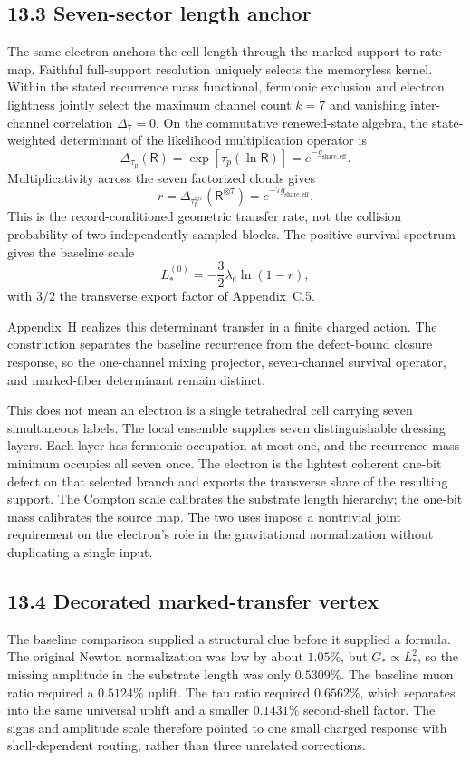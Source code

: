 \documentclass[11pt]{article}
\begin{document}
\subsection{13.3 Seven-sector length anchor}

The same electron anchors the cell length through the marked support-to-rate map. Faithful full-support resolution uniquely selects the memoryless kernel. Within the stated recurrence mass functional, fermionic exclusion and electron lightness jointly select the maximum channel count $k=7$ and vanishing inter-channel correlation $\Delta_7=0$. On the commutative renewed-state algebra, the state-weighted determinant of the likelihood multiplication operator is
\[
\Delta_{\tau_p}(\mathsf R)
=\exp[\tau_p(\ln\mathsf R)]
=e^{-g_{\mathrm{share,eff}}}.
\]
Multiplicativity across the seven factorized clouds gives
\[
r=\Delta_{\tau_p^{\otimes7}}(\mathsf R^{\otimes7})
=e^{-7g_{\mathrm{share,eff}}}.
\]
This is the record-conditioned geometric transfer rate, not the collision probability of two independently sampled blocks. The positive survival spectrum gives the baseline scale
\[
L_*^{(0)}=-\frac32\lambda_e\ln(1-r),
\]
with $3/2$ the transverse export factor of Appendix~C.5.

Appendix~H realizes this determinant transfer in a finite charged action. The construction separates the baseline recurrence from the defect-bound closure response, so the one-channel mixing projector, seven-channel survival operator, and marked-fiber determinant remain distinct.

This does not mean an electron is a single tetrahedral cell carrying seven simultaneous labels. The local ensemble supplies seven distinguishable dressing layers. Each layer has fermionic occupation at most one, and the recurrence mass minimum occupies all seven once. The electron is the lightest coherent one-bit defect on that selected branch and exports the transverse share of the resulting support. The Compton scale calibrates the substrate length hierarchy; the one-bit mass calibrates the source map. The two uses impose a nontrivial joint requirement on the electron's role in the gravitational normalization without duplicating a single input.

\subsection{13.4 Decorated marked-transfer vertex}

The baseline comparison supplied a structural clue before it supplied a formula. The original Newton normalization was low by about $1.05\%$, but $G_*\propto L_*^2$, so the missing amplitude in the substrate length was only $0.5309\%$. The baseline muon ratio required a $0.5124\%$ uplift. The tau ratio required $0.6562\%$, which separates into the same universal uplift and a smaller $0.1431\%$ second-shell factor. The signs and amplitude scale therefore pointed to one small charged response with shell-dependent routing, rather than three unrelated corrections.
\end{document}
